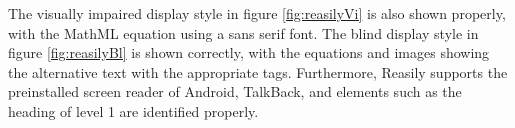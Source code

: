 The visually impaired display style in figure \ref{fig:reasilyVi} is also shown properly, with the MathML equation using a sans serif font. The blind display style in figure \ref{fig:reasilyBl} is shown correctly, with the equations and images showing the alternative text with the appropriate tags. Furthermore, Reasily supports the preinstalled screen reader of Android, TalkBack, and elements such as the heading of level 1 are identified properly.

